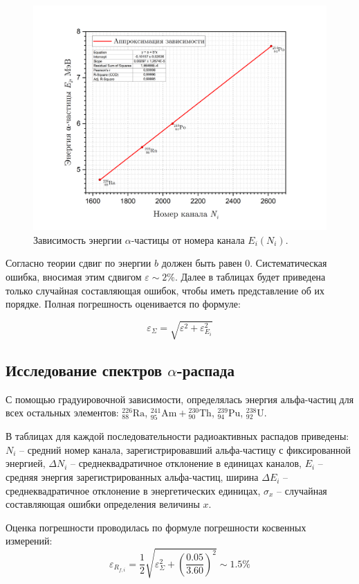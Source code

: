\documentclass[a4paper, 12pt]{article}
\newcommand{\elem}[3]{{}^{#2}_{#3}\text{#1}}
\newcommand{\Ra}{\elem{Ra}{226}{88}}
\newcommand{\Pu}{\elem{Pu}{239}{94}}
\newcommand{\Ua}{\elem{U}{238}{92}}
\newcommand{\Th}{\elem{Th}{230}{90}}
\newcommand{\Am}{\elem{Am}{241}{95}}
\begin{document}
    \begin{figure}[H]
        \centering
        \includegraphics[width = 12 cm]{images/calibration_graph .png}
        \caption{Зависимость энергии $\alpha$-частицы от номера канала $E_i(N_i)$.}
        \label{fig:w-channel}
    \end{figure}
	
    Согласно теории сдвиг по энергии $b$ должен быть равен 0. Систематическая ошибка, вносимая этим сдвигом $\varepsilon \sim 2\%$. Далее в таблицах будет приведена только случайная составляющая ошибок, чтобы иметь представление об их порядке. Полная погрешность оценивается по формуле:
    
    $$\varepsilon_\Sigma = \sqrt{\varepsilon^2 + \varepsilon_{E_i}^2}$$
	
    \subsection{Исследование спектров $\alpha$-распада}
	
    С помощью градуировочной зависимости, определялась энергия альфа-частиц для всех остальных элементов: $\Ra$, $\Am + \Th$, $\Pu$, $\Ua$.
	
    В таблицах для каждой последовательности радиоактивных распадов приведены: $N_i$ -- средний номер канала, зарегистрировавший альфа-частицу с фиксированной энергией, $\Delta N_i$ -- среднеквадратичное отклонение в единицах каналов, $E_i$ -- средняя энергия зарегистрированных альфа-частиц, ширина $\Delta E_i$ -- среднеквадратичное отклонение в энергетических единицах, $\sigma_x$ -- случайная составляющая  ошибки определения величины $x$.
	
    Оценка погрешности проводилась по формуле погрешности косвенных измерений:
    $$ 
    \varepsilon_{R_{f,i}} = \frac{1}{2} \sqrt{\varepsilon_\Sigma^2 + \left(\frac{0.05}{3.60}\right)^2} \sim 1.5 \%
    $$
    
\end{document}
